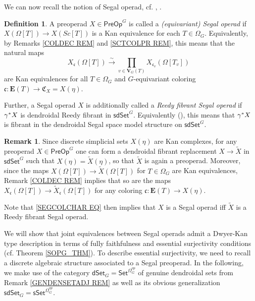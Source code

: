 \documentclass[a4paper,10pt
,draft
]{article}%
\numberwithin{equation}{section}
\numberwithin{figure}{section}
\theoremstyle{definition} %
\newtheorem{definition}[equation]{Definition}%
\newtheorem{remark}[equation]{Remark}%
\newcommand{\sdSet}{\mathsf{sdSet}}
\newcommand{\1}{\ensuremath{\mathbbm 1}}%
\begin{document}
We can now recall the notion of 
Segal operad, 
cf. \cite[Def. 5.5]{CM13b}, \cite[Def. 4.40]{BP_edss}.


\begin{definition}
	A preoperad $X \in \mathsf{PreOp}^G$ is called a \emph{(equivariant) Segal operad} if
	$X\left( \Omega[T] \right) \to 
	X \left( Sc[T] \right)$
	is a Kan equivalence for each $T \in \Omega_G$.
%
	Equivalently, by Remarks \ref{COLDEC REM}
	and \ref{SCTCOLPR REM},
	this means that the natural maps
\begin{equation}\label{SEGCOLCHAR EQ}
	X_{\mathfrak{c}}(\Omega[T])
	\xrightarrow{\sim}
		\prod_{v \in \boldsymbol{V}_G(T)}
	X_{\mathfrak{c}_v}(\Omega[T_v])
\end{equation}
	are Kan equivalences for all 
	$T \in \Omega_G$
	and $G$-equivariant coloring
	$\mathfrak{c} \colon 
	\boldsymbol{E}(T) \to \mathfrak{C}_X = X(\eta)$.
	
	Further, a Segal operad $X$ is additionally called a
	\emph{Reedy fibrant Segal operad} 
	if $\gamma^{\**}X$ is dendroidal Reedy fibrant in $\sdSet^G$.
	Equivalently (\cite[Remark 4.41]{BP_edss}),
	this means that $\gamma^{\**}X$ is fibrant in the dendroidal Segal space model structure on $\sdSet^G$.
\end{definition}



\begin{remark}\label{REPSEGOPS REM}
Since discrete simplicial sets 
$X(\eta)$ are Kan complexes,
for any preoperad 
$X \in \mathsf{PreOp}^G$
one can form a dendroidal 
fibrant replacement 
$X \to \widetilde{X}$ in 
$\mathsf{sdSet}^G$
such that 
$X(\eta) = \widetilde{X}(\eta)$,
so that $\widetilde{X}$
is again a preoperad.
Moreover, since the maps
$X(\Omega[T]) \to \widetilde{X}(\Omega[T])$ for $T \in \Omega_G$
are Kan equivalences,
Remark \ref{COLDEC REM}
implies that so are the maps
$X_{\mathfrak{c}}(\Omega[T]) \to \widetilde{X}_{\mathfrak{c}}(\Omega[T])$
for any coloring
$\mathfrak{c} \colon \boldsymbol{E}(T) \to X(\eta)$.

Note that \eqref{SEGCOLCHAR EQ} 
then implies that $X$ is a Segal operad iff 
$\widetilde{X}$ is a Reedy fibrant Segal operad.
\end{remark}



We will show that joint equivalences 
between Segal operads
admit a Dwyer-Kan type description 
in terms of fully faithfulness and essential surjectivity 
conditions (cf. Theorem \ref{SOPG_THM}).
To describe essential surjectivity,
we need to recall a discrete 
algebraic structure associated to a Segal preoperad.
In the following, we make use of the category
$\mathsf{dSet}_G= \mathsf{Set}^{\Omega_G^{op}}$
of genuine dendroidal sets from
Remark \ref{GENDENSETADJ REM}
as well as its obvious generalization
$\mathsf{sdSet}_G= \mathsf{sSet}^{\Omega_G^{op}}$.
\end{document}
